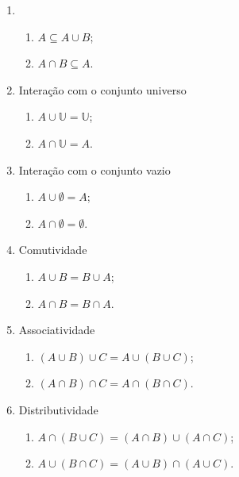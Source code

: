 \documentclass[13pt,letterpaper]{article}
\begin{document}
\begin{enumerate}
    \item  
    \begin{enumerate}
        \item $A \subseteq A \cup B$;
        \item $A \cap B \subseteq A$.
    \end{enumerate}
    \item Interação com o conjunto universo
    \begin{enumerate}
        \item $A \cup \mathbb{U} = \mathbb{U}$;
        \item $A \cap \mathbb{U} = A$.
    \end{enumerate}
    \item Interação com o conjunto vazio
    \begin{enumerate}
        \item $A \cup \emptyset = A$;
        \item $A \cap \emptyset = \emptyset$.
    \end{enumerate}
    \item Comutividade
    \begin{enumerate}
        \item $A \cup B = B \cup A$;
        \item $A \cap B = B \cap A$.
    \end{enumerate}
    \item Associatividade
    \begin{enumerate}
        \item $(A \cup B) \cup C = A \cup (B \cup C)$;
        \item $(A \cap B) \cap C = A \cap (B \cap C)$.
    \end{enumerate}
    \item Distributividade
    \begin{enumerate}
        \item $A \cap (B \cup C) = (A \cap B) \cup (A \cap C)$;
        \item $A \cup (B \cap C) = (A \cup B) \cap (A \cup C)$.
    \end{enumerate}
\end{enumerate}
\end{document}
